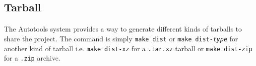 \documentclass{report}
\begin{document}
\subsection{Tarball}

\paragraph{} The Autotools system provides a way to generate different kinds of
tarballs to share the project. The command is simply \texttt{make dist} or
\texttt{make dist-\textit{type}} for another kind of tarball i.e.  \texttt{make
dist-xz} for a \texttt{.tar.xz} tarball or \texttt{make dist-zip} for a
\texttt{.zip} archive.
\end{document}
